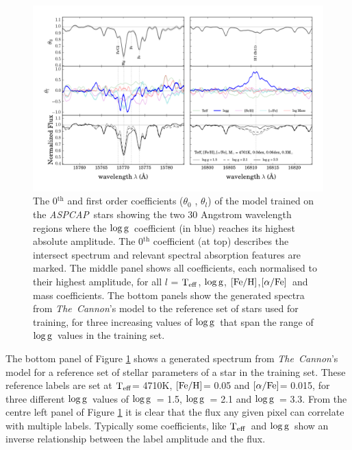 \documentclass[12pt, preprint]{aastex}
\newcommand{\project}[1]{\textsl{#1}}
\newcommand{\tc}{\project{The~Cannon}}
\newcommand{\aspcap}{\project{ASPCAP}}
\newcommand{\teff}{\mbox{$\rm T_{eff}$}}
\newcommand{\feh}{\mbox{$\rm [Fe/H]$}}
\newcommand{\alphafe}{\mbox{$\rm [\alpha/Fe]$}}
\newcommand{\logg}{\mbox{$\rm \log g$}}
\begin{document}
\begin{figure}[h!]
\centering
    \includegraphics[scale=0.51]{./plots/coeffs_g_3.png}
  \caption{The 0$^{\mbox{th}}$ and first order coefficients ($\theta_0$ , $\theta_{\mbox{$l$}}$) of the model trained on the \aspcap\ stars showing the two 30 Angstrom wavelength regions where the \logg\ coefficient (in blue) reaches its highest absolute amplitude. The 0$^{\mbox{th}}$ coefficient (at top) describes the intersect spectrum and relevant spectral absorption features are marked. The middle panel shows all coefficients, each normalised to their highest amplitude, for all \textit{$l$} = \teff, \logg, \feh,\alphafe\ and mass coefficients. The bottom panels show the generated spectra from \tc's model to the reference set of stars used for training, for three increasing values of \logg\ that span the range of \logg\ values in the training set.}
\label{fig:logg}
\end{figure}

The bottom panel of Figure  \ref{fig:logg} shows a generated spectrum from \tc's model for a reference set of stellar parameters of a star in the training set. These reference labels are set at \teff = 4710K, \feh = 0.05 and \alphafe = 0.015, for three different \logg\ values of \logg\ = 1.5, \logg\ = 2.1 and \logg\ = 3.3. From the centre left panel of Figure \ref{fig:logg} it is clear that the flux any given pixel can correlate with multiple labels. Typically some coefficients, like \teff\ and \logg\ show an inverse relationship between the label amplitude and the flux.
\end{document}
